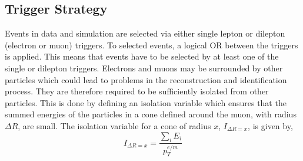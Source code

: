\subsection{Trigger Strategy}
\label{sec:trigger}
Events in data and simulation are selected via either single lepton or dilepton (electron or muon) triggers. To selected events, a logical OR between the triggers is applied. This means that events have to be selected by at least one of the single or dilepton triggers. Electrons and muons may be surrounded by other particles which could lead to problems in the reconstruction and identification process. They are therefore required to be sufficiently isolated from other particles. This is done by defining an isolation variable which ensures that the summed energies of the particles in a cone defined around the muon, with radius $\Delta R$, are small. The isolation variable for a cone of radius $x$, $I_{\Delta R = x}$, is given by,
\begin{equation}
I_{\Delta R = x} = \frac{\sum_{i} E_{i}}{p^{e/m}_{T}}
\end{equation}
